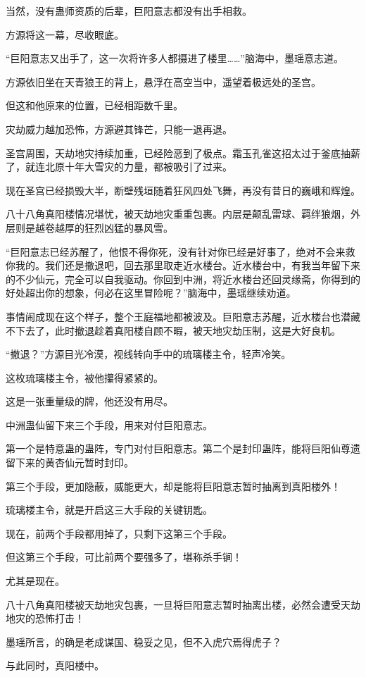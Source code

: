 \begin{this_body}
当然，没有蛊师资质的后辈，巨阳意志都没有出手相救。

方源将这一幕，尽收眼底。

“巨阳意志又出手了，这一次将许多人都摄进了楼里……”脑海中，墨瑶意志道。

方源依旧坐在天青狼王的背上，悬浮在高空当中，遥望着极远处的圣宫。

但这和他原来的位置，已经相距数千里。

灾劫威力越加恐怖，方源避其锋芒，只能一退再退。

圣宫周围，天劫地灾持续加重，已经险恶到了极点。霜玉孔雀这招太过于釜底抽薪了，就连北原十年大雪灾的力量，都被吸引了过来。

现在圣宫已经损毁大半，断壁残垣随着狂风四处飞舞，再没有昔日的巍峨和辉煌。

八十八角真阳楼情况堪忧，被天劫地灾重重包裹。内层是颠乱雷球、羁绊狼烟，外层则是越卷越厚的狂烈凶猛的暴风雪。

“巨阳意志已经苏醒了，他恨不得你死，没有针对你已经是好事了，绝对不会来救你我的。我们还是撤退吧，回去那里取走近水楼台。近水楼台中，有我当年留下来的不少仙元，完全可以自我驱动。你回到中洲，将近水楼台还回灵缘斋，你得到的好处超出你的想象，何必在这里冒险呢？”脑海中，墨瑶继续劝道。

事情闹成现在这个样子，整个王庭福地都被波及。巨阳意志苏醒，近水楼台也潜藏不下去了，此时撤退趁着真阳楼自顾不暇，被天地灾劫压制，这是大好良机。

“撤退？”方源目光冷漠，视线转向手中的琉璃楼主令，轻声冷笑。

这枚琉璃楼主令，被他攥得紧紧的。

这是一张重量级的牌，他还没有用尽。

中洲蛊仙留下来三个手段，用来对付巨阳意志。

第一个是特意蛊的蛊阵，专门对付巨阳意志。第二个是封印蛊阵，能将巨阳仙尊遗留下来的黄杏仙元暂时封印。

第三个手段，更加隐蔽，威能更大，却是能将巨阳意志暂时抽离到真阳楼外！

琉璃楼主令，就是开启这三大手段的关键钥匙。

现在，前两个手段都用掉了，只剩下这第三个手段。

但这第三个手段，可比前两个要强多了，堪称杀手锏！

尤其是现在。

八十八角真阳楼被天劫地灾包裹，一旦将巨阳意志暂时抽离出楼，必然会遭受天劫地灾的恐怖打击！

墨瑶所言，的确是老成谋国、稳妥之见，但不入虎穴焉得虎子？

与此同时，真阳楼中。


\end{this_body}
